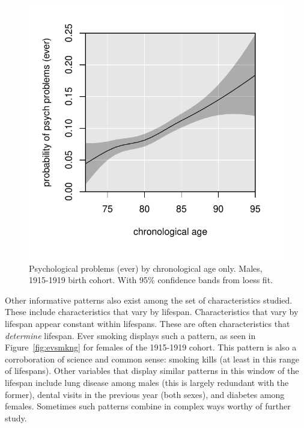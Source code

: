 \documentclass[11pt,oneside]{article} %
\begin{document}
\begin{figure}[!h]
 \centering
   \caption{Psychological problems (ever) by chronological age only. Males, 1915-1919 birth
    cohort. With 95{\%} confidence bands from loess fit.}
    \label{fig:chronofalse}
   \includegraphics[scale=.7]{Figures/MalePsychChrono.pdf}
\end{figure}

Other informative patterns also exist among the set of characteristics studied.
These include characteristics that vary by lifespan. Characteristics that vary
by lifespan appear constant within lifespans. These are often characteristics that
\textit{determine} lifespan. Ever smoking displays such a pattern, as seen in
Figure~\ref{fig:evsmkng} for females of the 1915-1919 cohort. This pattern is
also a corroboration of science and common sense: smoking kills (at least in
this range of lifespans). Other variables that display similar patterns in this
window of the lifespan include lung disease among males (this is largely
redundant with the former), dental visits in the previous year (both sexes),
and diabetes among females. Sometimes such patterns combine in complex ways
worthy of further study.
\end{document}
